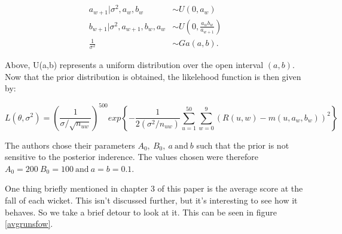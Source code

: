 \begin{align}
    a_{w+1}|\sigma^2,a_w,b_w &\sim U(0,a_w) \\
    b_{w+1}|\sigma^2,a_{w+1},b_w,a_w &\sim U\left(0,\frac{a_wb_w}{a_{w+1}}\right) \\
    \frac{1}{\sigma^2} &\sim Ga(a,b).
\end{align}

Above, U(a,b) represents a uniform distribution over the open interval $(a,b)$. Now that the prior distribution is obtained, the likelehood function is then 
given by:

\begin{equation}
    L(\theta,\sigma^2) = \left( \frac{1}{\sigma / \sqrt{n_{uw}}} \right)^{500} exp \left\{ - \frac{1}{2(\sigma^2 / n_{uw})} \sum_{u=1}^{50} \sum_{w=0}^9 (R(u,w)-m(u,a_w,b_w))^2  \right\}
\end{equation}

The authors chose their parameters $A_0, \ B_0, \ a \ \text{and} \ b$ such that the prior is not sensitive to the posterior inderence. The values chosen
were therefore $A_0=200 \ B_0=100 \ \text{and} \ a=b=0.1$.

One thing briefly mentioned in chapter 3 of this paper is the average score at the fall of each wicket. This isn't discussed further, but it's interesting to see how it behaves.
So we take a brief detour to look at it. This can be seen in figure \ref{avgrunsfow}.

